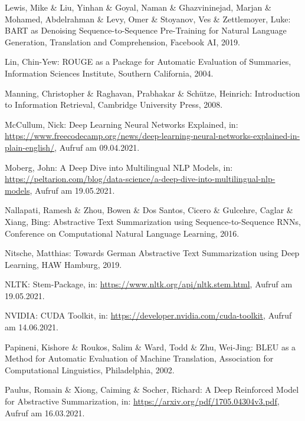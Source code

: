 \begin{thebibliography}{104}
Lewis, Mike \& Liu, Yinhan \& Goyal, Naman \& Ghazvininejad, Marjan \& Mohamed, Abdelrahman \& Levy, Omer \& Stoyanov, Ves \& Zettlemoyer, Luke: BART as Denoising Sequence-to-Sequence Pre-Training for Natural
Language Generation, Translation and Comprehension, Facebook AI, 2019.

Lin, Chin-Yew: ROUGE as a Package for Automatic Evaluation of Summaries, Information Sciences Institute, Southern California, 2004.

Manning, Christopher \& Raghavan, Prabhakar \& Schütze, Heinrich: Introduction to Information Retrieval, Cambridge University Press, 2008.

McCullum, Nick: Deep Learning Neural Networks Explained, in: \url{https://www.freecodecamp.org/news/deep-learning-neural-networks-explained-in-plain-english/}, Aufruf am 09.04.2021.

Moberg, John: A Deep Dive into Multilingual NLP Models, in: \url{https://peltarion.com/blog/data-science/a-deep-dive-into-multilingual-nlp-models}, Aufruf am 19.05.2021.

Nallapati, Ramesh \& Zhou, Bowen \& Dos Santos, Cicero \& Gulcehre, Caglar \& Xiang, Bing: Abstractive Text Summarization using Sequence-to-Sequence RNNs, Conference on Computational Natural Language Learning, 2016.

Nitsche, Matthias: Towards German Abstractive Text Summarization using Deep Learning, HAW Hamburg, 2019.

NLTK: Stem-Package, in: \url{https://www.nltk.org/api/nltk.stem.html}, Aufruf am 19.05.2021.

NVIDIA: CUDA Toolkit, in: \url{https://developer.nvidia.com/cuda-toolkit}, Aufruf am 14.06.2021.

Papineni, Kishore \& Roukos, Salim \& Ward, Todd \& Zhu, Wei-Jing: BLEU as a Method for Automatic Evaluation of Machine Translation, Association for Computational Linguistics, Philadelphia, 2002.

Paulus, Romain \& Xiong, Caiming \& Socher, Richard: A Deep Reinforced Model for Abstractive Summarization, in: \url{https://arxiv.org/pdf/1705.04304v3.pdf}, Aufruf am 16.03.2021.


\end{thebibliography}
